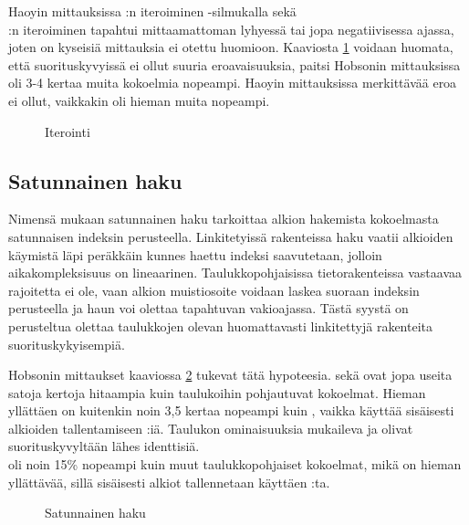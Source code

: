 Haoyin mittauksissa\cite{haoyiBenchmark} :n iteroiminen -silmukalla sekä \\:n iteroiminen tapahtui mittaamattoman lyhyessä tai jopa negatiivisessa ajassa, joten on kyseisiä mittauksia ei otettu huomioon. Kaaviosta \ref{iterointi_kaavio} voidaan huomata, että suorituskyvyissä ei ollut suuria eroavaisuuksia, paitsi Hobsonin mittauksissa\cite{hobsonBenchmark}  oli 3-4 kertaa muita kokoelmia nopeampi. Haoyin mittauksissa\cite{haoyiBenchmark} merkittävää eroa ei ollut, vaikkakin  oli hieman muita nopeampi.

\begin{figure}[h]
    \centering
    
    \caption{Iterointi}\label{iterointi_kaavio}
\end{figure}


\subsection{Satunnainen haku}
Nimensä mukaan satunnainen haku tarkoittaa alkion hakemista kokoelmasta satunnaisen indeksin perusteella. Linkitetyissä rakenteissa haku vaatii alkioiden käymistä läpi peräkkäin kunnes haettu indeksi saavutetaan, jolloin aikakompleksisuus on lineaarinen. Taulukkopohjaisissa tietorakenteissa vastaavaa rajoitetta ei ole, vaan alkion muistiosoite voidaan laskea suoraan indeksin perusteella ja haun voi olettaa tapahtuvan vakioajassa. Tästä syystä on perusteltua olettaa taulukkojen olevan huomattavasti linkitettyjä rakenteita suorituskykyisempiä.

Hobsonin mittaukset\cite{hobsonBenchmark} kaaviossa \ref{satunnainenHaku_kaavio} tukevat tätä hypoteesia.  sekä  ovat jopa useita satoja kertoja hitaampia kuin taulukoihin pohjautuvat kokoelmat. Hieman yllättäen  on kuitenkin noin 3,5 kertaa nopeampi kuin , vaikka  käyttää sisäisesti alkioiden tallentamiseen :iä. Taulukon ominaisuuksia mukaileva  ja  olivat suorituskyvyltään lähes identtisiä. \\ oli noin 15\% nopeampi kuin muut taulukkopohjaiset kokoelmat, mikä on hieman yllättävää, sillä sisäisesti alkiot tallennetaan käyttäen :ta.

\begin{figure}[h]
    \centering
    
    \caption{Satunnainen haku}\label{satunnainenHaku_kaavio}
\end{figure}


